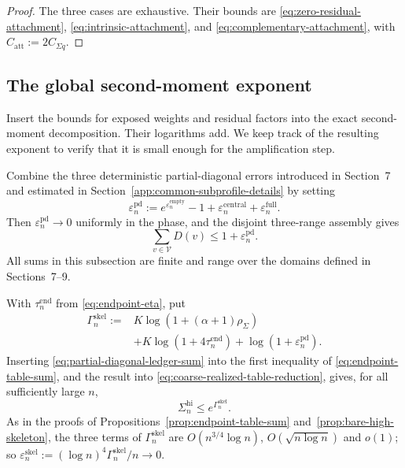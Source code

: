 \documentclass[a4paper,10pt,reqno]{amsart}
\numberwithin{equation}{section}
\theoremstyle{plain}
\theoremstyle{remark}
\begin{document}
\begin{proof}
The three cases are exhaustive.  Their bounds are
\eqref{eq:zero-residual-attachment},
\eqref{eq:intrinsic-attachment}, and
\eqref{eq:complementary-attachment}, with
$C_{\mathrm{att}}:=2C_{\Sigma q}$.
\end{proof}

\subsection{The global second-moment exponent}
\label{subsec:explicit-global-ledger}

Insert the bounds for exposed weights and residual factors into the
exact second-moment decomposition. Their logarithms add. We keep track
of the resulting exponent to verify that it is small enough for the
amplification step.

Combine the three deterministic partial-diagonal errors introduced in
Section~7 and estimated in Section~\ref{app:common-subprofile-details} by
setting
\begin{equation}
  \varepsilon_n^{\mathrm{pd}}
  :=
  e^{\varepsilon_n^{\mathrm{empty}}}-1
  +\varepsilon_n^{\mathrm{central}}
  +\varepsilon_n^{\mathrm{full}}.
  \label{eq:partial-diagonal-ledger}
\end{equation}
Then $\varepsilon_n^{\mathrm{pd}}\to0$ uniformly in the phase, and the disjoint
three-range assembly gives
\begin{equation}
  \sum_{v\in\mathcal V}D(v)\le1+\varepsilon_n^{\mathrm{pd}}.
  \label{eq:partial-diagonal-ledger-sum}
\end{equation}
All sums in this subsection are finite and range over the domains defined in
Sections~7--9.

With $\tau_n^{\mathrm{end}}$ from \eqref{eq:endpoint-eta}, put
\begin{equation}
\begin{split}
  \Gamma_n^{\mathrm{skel}}
  :={}&
  K\log\!\left(1+(\alpha+1)\rho_{\Sigma}\right)\\
  &+K\log\!\left(1+4\tau_n^{\mathrm{end}}\right)
  +\log\!\left(1+\varepsilon_n^{\mathrm{pd}}\right).
\end{split}
  \label{eq:explicit-skeleton-ledger}
\end{equation}
Inserting \eqref{eq:partial-diagonal-ledger-sum} into the first inequality
of \eqref{eq:endpoint-table-sum}, and the result into
\eqref{eq:coarse-realized-table-reduction}, gives, for all sufficiently
large $n$,
\begin{equation}
  \Sigma_n^{\mathrm{hi}}
  \le e^{\Gamma_n^{\mathrm{skel}}}.
  \label{eq:explicit-bare-skeleton-bound}
\end{equation}
As in the proofs of Propositions~\ref{prop:endpoint-table-sum}
and~\ref{prop:bare-high-skeleton}, the three terms of
$\Gamma_n^{\mathrm{skel}}$ are $O(n^{3/4}\log n)$, $O(\sqrt{n\log n})$ and
$o(1)$; so
$\varepsilon_n^{\mathrm{skel}}:=(\log n)^4\Gamma_n^{\mathrm{skel}}/n\to0$.
\end{document}
